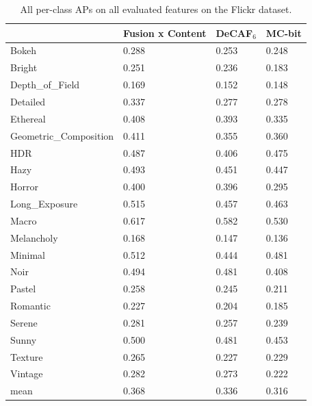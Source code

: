 \begin{table}[ht!]
\caption{
    All per-class APs on all evaluated features on the Flickr dataset.
}\label{tab:flickr_ap_table}
\vspace{1em}
\centering
\begin{tabular}{llll}
\toprule
{}                     & Fusion x Content & DeCAF$_6$ & MC-bit \\
\midrule
Bokeh                  & 0.288            & 0.253     & 0.248 \\
Bright                 & 0.251            & 0.236     & 0.183 \\
Depth\_of\_Field       & 0.169            & 0.152     & 0.148 \\
Detailed               & 0.337            & 0.277     & 0.278 \\
Ethereal               & 0.408            & 0.393     & 0.335 \\
Geometric\_Composition & 0.411            & 0.355     & 0.360 \\
HDR                    & 0.487            & 0.406     & 0.475 \\
Hazy                   & 0.493            & 0.451     & 0.447 \\
Horror                 & 0.400            & 0.396     & 0.295 \\
Long\_Exposure         & 0.515            & 0.457     & 0.463 \\
Macro                  & 0.617            & 0.582     & 0.530 \\
Melancholy             & 0.168            & 0.147     & 0.136 \\
Minimal                & 0.512            & 0.444     & 0.481 \\
Noir                   & 0.494            & 0.481     & 0.408 \\
Pastel                 & 0.258            & 0.245     & 0.211 \\
Romantic               & 0.227            & 0.204     & 0.185 \\
Serene                 & 0.281            & 0.257     & 0.239 \\
Sunny                  & 0.500            & 0.481     & 0.453 \\
Texture                & 0.265            & 0.227     & 0.229 \\
Vintage                & 0.282            & 0.273     & 0.222 \\
\midrule
mean                   & 0.368            & 0.336     & 0.316 \\
\bottomrule
\end{tabular}
\end{table}

